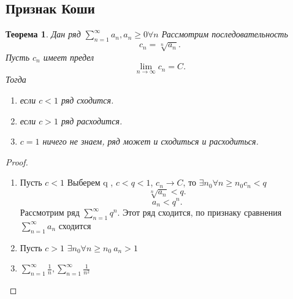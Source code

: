 \documentclass{scrartcl}
\newtheorem{theorem}{Теорема}
\begin{document}
\subsection{Признак Коши}
\begin{theorem}
    Дан ряд $\sum_{n=1}^{\infty} a_{n} , a_{n} \ge  0 \forall n$ 
    Рассмотрим последовательность 
    \[
        c_{n} = \sqrt[n]{a_{n}} 
    .\] 
    Пусть $c_{n}$ имеет предел
    \[
    \lim_{n \to \infty} c_{n} = C
    .\] 
    Тогда
    \begin{enumerate}
        \item если $c < 1$ ряд сходится.
        \item  если  $c > 1$ ряд расходится.
        \item  $c = 1$ ничего не знаем, ряд может и сходиться и расходиться.
    \end{enumerate}
\end{theorem}
\begin{proof}
    \begin{enumerate}
        \item Пусть $c < 1$
            Выберем q ,  $c < q < 1$,  $c_{n} \to C$, то $\exists  n_0 \forall  n\ge n_0 c_{n} < q$
             \[
                 \sqrt[n]{a_{n}}  < q
             .\] 
             \[
             a_{n} < q^{n}
             .\] 
             Рассмотрим ряд $\sum_{n=1}^{\infty} q^{n}$. Этот ряд сходится, по признаку сравнения $\sum_{n=1}^{\infty} a_{n}$ сходится
            \item
                Пусть $c > 1$  $\exists n_0 \forall n\ge n_0 ~ a_{n} > 1$ 
            \item $\sum_{n=1}^{\infty} \frac{1}{n}, \sum_{n=1}^{\infty} \frac{1}{n^2} $
    \end{enumerate}
\end{proof}
\end{document}
